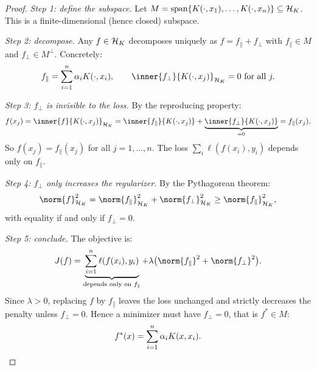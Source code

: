 \begin{notechapter}
\begin{proof}
\emph{Step 1: define the subspace.} Let $M = \operatorname{span}\{K(\cdot, x_1),
\ldots, K(\cdot, x_n)\} \subseteq \mathcal{H}_K$. This is a finite-dimensional
(hence closed) subspace.

\emph{Step 2: decompose.} Any $f \in \mathcal{H}_K$ decomposes uniquely as $f =
f_\parallel + f_\perp$ with $f_\parallel \in M$ and $f_\perp \in
M^\perp$. Concretely:
\[
f_\parallel = \sum_{i=1}^n \alpha_i K(\cdot, x_i), \qquad
\inner{f_\perp}{K(\cdot, x_j)}_{\hk} = 0 \text{ for all } j.
\]

\emph{Step 3: $f_\perp$ is invisible to the loss.} By the reproducing
property:
\[
f(x_j) = \inner{f}{K(\cdot, x_j)}_{\hk} = \inner{f_\parallel}{K(\cdot,
x_j)} + \underbrace{\inner{f_\perp}{K(\cdot, x_j)}}_{= 0} =
f_\parallel(x_j).
\]
So $f(x_j) = f_\parallel(x_j)$ for all $j = 1, \ldots, n$. The loss
$\sum_i \ell(f(x_i), y_i)$ depends only on $f_\parallel$.

\emph{Step 4: $f_\perp$ only increases the regularizer.} By the
Pythagorean theorem:
\[
\norm{f}_{\hk}^2 = \norm{f_\parallel}_{\hk}^2 + \norm{f_\perp}_{\hk}^2
\geq \norm{f_\parallel}_{\hk}^2,
\]
with equality if and only if $f_\perp = 0$.

\emph{Step 5: conclude.} The objective is:
\[
J(f) = \underbrace{\sum_{i=1}^n \ell(f(x_i), y_i)}_{\text{depends only
on } f_\parallel} + \lambda\bigl(\norm{f_\parallel}^2 +
\norm{f_\perp}^2\bigr).
\]
Since $\lambda > 0$, replacing $f$ by $f_\parallel$ leaves the loss unchanged and strictly decreases the penalty unless $f_\perp = 0$. Hence a minimizer must have $f_\perp = 0$, that is $f^* \in M$:
\[
f^*(x) = \sum_{i=1}^n \alpha_i K(x, x_i). \qedhere
\]
\end{proof}

\begin{figure}[ht]
\centering
{}
\end{figure}
\end{notechapter}
